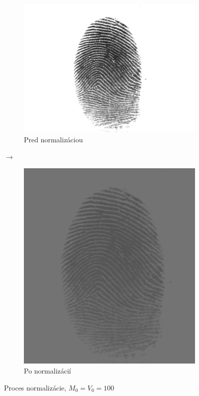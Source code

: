 \documentclass[11pt,a4paper]{article}
\begin{document}
\begin{figure}[h]
	\centering
	\begin{subfigure}{0.50\textwidth}
		\centering
		\includegraphics[width=\linewidth]{images/Screenshot_1}
		\caption{Pred normalizáciou}
	\end{subfigure}%
	{\LARGE$\xrightarrow{}$}
	\begin{subfigure}{0.45\textwidth}
		\centering
		\includegraphics[width=.7\linewidth]{images/Screenshot_8}
		\caption{Po normalizácií}
	\end{subfigure}%
	\caption{Proces normalizácie, $M_0 = V_0 = 100$}\label{fig:3}
\end{figure}
\end{document}
